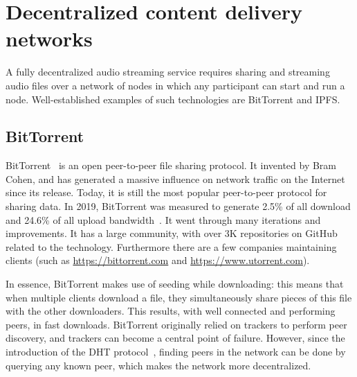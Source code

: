 
\section{Decentralized content delivery networks}
\label{sec:decentralized-content-delivery}
A fully decentralized audio streaming service requires sharing and streaming audio files over a network of nodes in which any participant can start and run a node. Well-established examples of such technologies are BitTorrent and IPFS.

\subsection{BitTorrent}
BitTorrent~\citep{cohen2002bittorrent} is an open peer-to-peer file sharing protocol. It invented by Bram Cohen, and has generated a massive influence on network traffic on the Internet since its release. Today, it is still the most popular peer-to-peer protocol for sharing data. In 2019, BitTorrent was measured to generate 2.5\% of all download and 24.6\% of all upload bandwidth~\citep{marozzo2020}. It went through many iterations and improvements. It has a large community, with over 3K repositories on GitHub related to the technology. Furthermore there are a few companies maintaining clients (such as \url{https://bittorrent.com} and \url{https://www.utorrent.com}).

In essence, BitTorrent makes use of seeding while downloading: this means that when multiple clients download a file, they simultaneously share pieces of this file with the other downloaders. This results, with well connected and performing peers, in fast downloads. BitTorrent originally relied on trackers to perform peer discovery, and trackers can become a central point of failure. However, since the introduction of the DHT protocol~\citep{bittorrentbep5dht}, finding peers in the network can be done by querying any known peer, which makes the network more decentralized. 


